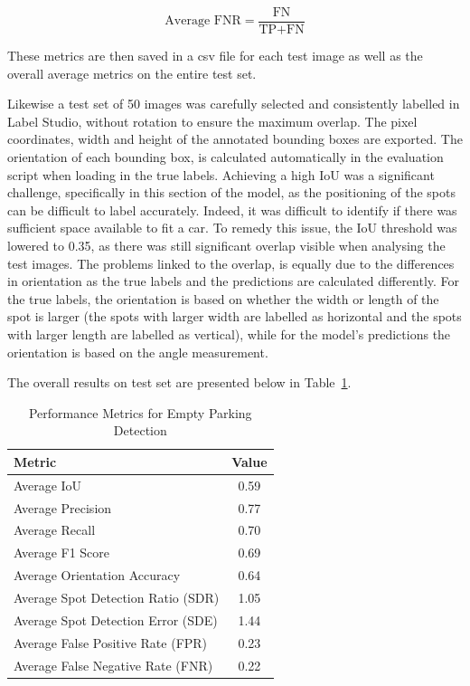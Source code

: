\[
\text{Average FNR} = \frac{\text{FN}}{\text{TP} + \text{FN}}
\]

These metrics are then saved in a csv file for each test image as well as the overall average metrics on the entire test set.

Likewise a test set of 50 images was carefully selected and consistently labelled in Label Studio, without rotation to ensure the maximum overlap. The pixel coordinates, width and height of the annotated bounding boxes are exported. The orientation of each bounding box, is calculated automatically in the evaluation script when loading in the true labels.
Achieving a high IoU was a significant challenge, specifically in this section of the model, as the positioning of the spots can be difficult to label accurately. Indeed, it was difficult to identify if there was sufficient space available to fit a car.
To remedy this issue, the IoU threshold was lowered to 0.35, as there was still significant overlap visible when analysing the test images.
The problems linked to the overlap, is equally due to the differences in orientation as the true labels and the predictions are calculated differently.
For the true labels, the orientation is based on whether the width or length of the spot is larger (the spots with larger width are labelled as horizontal and the spots with larger length are labelled as vertical), while for the model's predictions the orientation is based on the angle measurement.

The overall results on test set are presented below in Table~\ref{tab:metrics2}.


\begin{table}[htbp]
  \centering
  \begin{tabular}{|l|c|}
    \hline
    \textbf{Metric}                    & \textbf{Value} \\ \hline
    Average IoU                        & 0.59           \\ \hline
    Average Precision                  & 0.77           \\ \hline
    Average Recall                     & 0.70           \\ \hline
    Average F1 Score                   & 0.69           \\ \hline
    Average Orientation Accuracy       & 0.64           \\ \hline
    Average Spot Detection Ratio (SDR) & 1.05           \\ \hline
    Average Spot Detection Error (SDE) & 1.44           \\ \hline
    Average False Positive Rate (FPR)  & 0.23           \\ \hline
    Average False Negative Rate (FNR)  & 0.22           \\ \hline
  \end{tabular}
  \caption{Performance Metrics for Empty Parking Detection}
  \label{tab:metrics2}
\end{table}


